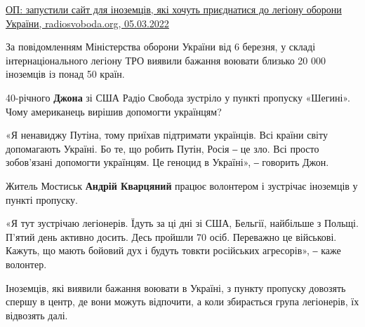 \href{https://www.radiosvoboda.org/a/news-inozemtsi-oborona-ukraina/31737633.html}{%
ОП: запустили сайт для іноземців, які хочуть приєднатися до легіону оборони України, %
radiosvoboda.org, 05.03.2022%
}


За повідомленням Міністерства оборони України від 6 березня, у складі
інтернаціонального легіону ТРО виявили бажання воювати близько 20 000 іноземців
із понад 50 країн.

40-річного \textbf{Джона} зі США Радіо Свобода зустріло у пункті пропуску «Шегині». Чому
американець вирішив допомогти українцям?

«Я ненавиджу Путіна, тому приїхав підтримати українців. Всі країни світу
допомагають Україні. Бо те, що робить Путін, Росія ‒ це зло. Всі просто
зобов'язані допомогти українцям. Це геноцид в Україні», ‒ говорить Джон.

Житель Мостиськ \textbf{Андрій Кварцяний} працює волонтером і зустрічає
іноземців у пункті пропуску.

«Я тут зустрічаю легіонерів. Їдуть за ці дні зі США, Бельгії, найбільше з
Польщі. П’ятий день активно досить. Десь пройшли 70 осіб. Переважно це
військові. Кажуть, що мають бойовий дух і будуть товкти російських агресорів»,
‒ каже волонтер.

Іноземців, які виявили бажання воювати в Україні, з пункту пропуску довозять
спершу в центр, де вони можуть відпочити, а коли збирається група легіонерів,
їх відвозять далі.

